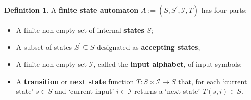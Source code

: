 \documentclass[a4paper]{article}
\theoremstyle{definition}
\newtheorem{definition}{Definition}[section]
\theoremstyle{definition}
\theoremstyle{definition}
\begin{document}
\newcommand{\inputAlphabet}{\mathcal{I}}
\newcommand{\automataDef}{(S, S^\prime, \inputAlphabet, T)}
\begin{definition}
    \label{def:fsa}
    A \textbf{finite state automaton} $A := \automataDef$ has four parts:
    \begin{itemize}
        \item A finite non-empty set of internal \textbf{states} $S$;
        \item A subset of states $S^\prime \subseteq S$ designated as \textbf{accepting states};
        \item A finite non-empty set $\inputAlphabet$, called the \textbf{input alphabet}, of input symbols;
        \item A \textbf{transition} or \textbf{next state} function $T : S \times \inputAlphabet \rightarrow S$ that, for each `current state' $s \in S$ and `current input' $i \in \inputAlphabet$ returns a `next state' $T(s,i) \in S$.
    \end{itemize}
\end{definition}
\end{document}
